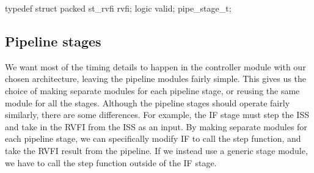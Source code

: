 \begin{systemverilog}
typedef struct packed {
    st_rvfi rvfi;
    logic valid;
} pipe_stage_t; 
\end{systemverilog}








\subsection{Pipeline stages}

We want most of the timing details to happen in the controller module with our chosen architecture, leaving the pipeline modules fairly simple. This gives us the choice of making separate modules for each pipeline stage, or reusing the same module for all the stages. Although the pipeline stages should operate fairly similarly, there are some differences. For example, the IF stage must step the ISS and take in the RVFI from the ISS as an input. By making separate modules for each pipeline stage, we can specifically modify IF to call the step function, and take the RVFI result from the pipeline. If we instead use a generic stage module, we have to call the step function outside of the IF stage. 

